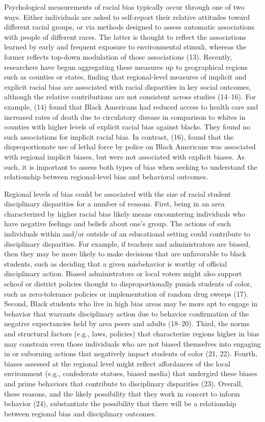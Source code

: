 \documentclass[9pt,twocolumn,twoside,lineno]{pnas-new}
\begin{document}
Psychological measurements of racial bias typically occur through one of
two ways. Either individuals are asked to self-report their relative
attitudes toward different racial groups, or via methods designed to
assess automatic associations with people of different races. The latter
is thought to reflect the associations learned by early and frequent
exposure to environmental stimuli, whereas the former reflects top-down
modulation of those associations (13). Recently, researchers have begun
aggregating these measures up to geographical regions such as counties
or states, finding that regional-level measures of implicit and explicit
racial bias are associated with racial disparities in key social
outcomes, although the relative contributions are not consistent across
studies (14--16). For example, (14) found that Black Americans had
reduced access to health care and increased rates of death due to
circulatory disease in comparison to whites in counties with higher
levels of explicit racial bias against blacks. They found no such
associations for implicit racial bias. In contrast, (16), found that the
disproportionate use of lethal force by police on Black Americans was
associated with regional implicit biases, but were not associated with
explicit biases. As such, it is important to assess both types of bias
when seeking to understand the relationship between regional-level bias
and behavioral outcomes.

Regional levels of bias could be associated with the size of racial
student disciplinary disparities for a number of reasons. First, being
in an area characterized by higher racial bias likely means encountering
individuals who have negative feelings and beliefs about one's group.
The actions of such individuals within and/or outside of an educational
setting could contribute to disciplinary disparities. For example, if
teachers and administrators are biased, then they may be more likely to
make decisions that are unfavorable to black students, such as deciding
that a given misbehavior is worthy of official disciplinary action.
Biased administrators or local voters might also support school or
district policies thought to disproportionally punish students of color,
such as zero-tolerance policies or implementation of random drug sweeps
(17). Second, Black students who live in high bias areas may be more apt
to engage in behavior that warrants disciplinary action due to behavior
confirmation of the negative expectancies held by area peers and adults
(18--20). Third, the norms and structural factors (e.g., laws, policies)
that characterize regions higher in bias may constrain even those
individuals who are not biased themselves into engaging in or suborning
actions that negatively impact students of color (21, 22). Fourth,
biases assessed at the regional level might reflect affordances of the
local environment (e.g., confederate statues, biased media) that
undergird these biases and prime behaviors that contribute to
disciplinary disparities (23). Overall, these reasons, and the likely
possibility that they work in concert to inform behavior (24),
substantiate the possibility that there will be a relationship between
regional bias and disciplinary outcomes.
\end{document}
